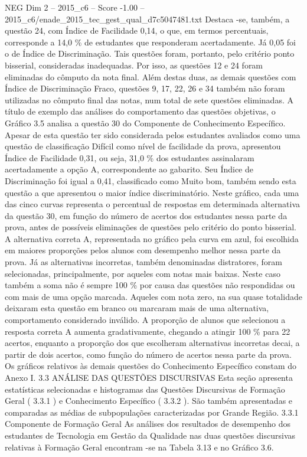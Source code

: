 \begin{textsample}{NEG Dim 2 – 2015\_c6 – Score -1.00 – 2015\_c6/enade\_2015\_tec\_gest\_qual\_d7c5047481.txt}
Destaca -se, também, a questão 24, com Índice de Facilidade 0,14, o que, em termos percentuais, corresponde a 14,0 \% de estudantes que responderam acertadamente.
Já 0,05 foi o de Índice de Discriminação.
Tais questões foram, portanto, pelo critério ponto bisserial, consideradas inadequadas.
Por isso, as questões 12 e 24 foram eliminadas do cômputo da nota final.
Além destas duas, as demais questões com Índice de Discriminação Fraco, questões 9, 17, 22, 26 e 34 também não foram utilizadas no cômputo final das notas, num total de sete questões eliminadas.
A título de exemplo das análises do comportamento das questões objetivas, o Gráfico 3.5 analisa a questão 30 do Componente de Conhecimento Específico.
Apesar de esta questão ter sido considerada pelos estudantes avaliados como uma questão de classificação Difícil como nível de facilidade da prova, apresentou Índice de Facilidade 0,31, ou seja, 31,0 \% dos estudantes assinalaram acertadamente a opção A, correspondente ao gabarito.
Seu Índice de Discriminação foi igual a 0,41, classificado como Muito bom, também sendo esta questão a que apresentou o maior índice discriminatório.
Neste gráfico, cada uma das cinco curvas representa o percentual de respostas em determinada alternativa da questão 30, em função do número de acertos dos estudantes nessa parte da prova, antes de possíveis eliminações de questões pelo critério do ponto bisserial.
A alternativa correta A, representada no gráfico pela curva em azul, foi escolhida em maiores proporções pelos alunos com desempenho melhor nessa parte da prova.
Já as alternativas incorretas, também denominadas distratores, foram selecionadas, principalmente, por aqueles com notas mais baixas.
Neste caso também a soma não é sempre 100 \% por causa das questões não respondidas ou com mais de uma opção marcada.
Aqueles com nota zero, na sua quase totalidade deixaram esta questão em branco ou marcaram mais de uma alternativa, comportamento considerado inválido.
A proporção de alunos que selecionou a resposta correta A aumenta gradativamente, chegando a atingir 100 \% para 22 acertos, enquanto a proporção dos que escolheram alternativas incorretas decai, a partir de dois acertos, como função do número de acertos nessa parte da prova.
Os gráficos relativos às demais questões do Conhecimento Específico constam do Anexo I. 3.3 ANÁLISE DAS QUESTÕES DISCURSIVAS Esta seção apresenta estatísticas selecionadas e histogramas das Questões Discursivas de Formação Geral ( 3.3.1 ) e Conhecimento Específico ( 3.3.2 ).
São também apresentadas e comparadas as médias de subpopulações caracterizadas por Grande Região. 3.3.1 Componente de Formação Geral As análises dos resultados de desempenho dos estudantes de Tecnologia em Gestão da Qualidade nas duas questões discursivas relativas à Formação Geral encontram -se na Tabela 3.13 e no Gráfico 3.6.

\end{textsample}
